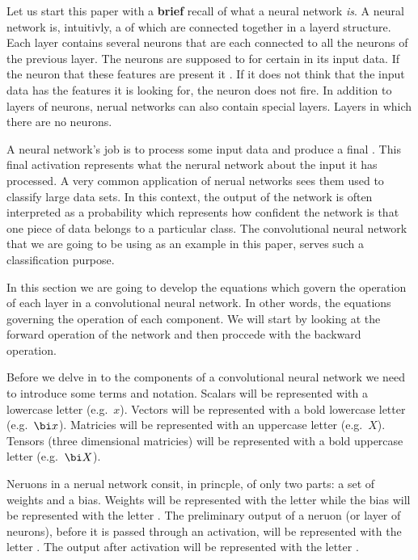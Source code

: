 \startsection[title=Convolutional neural networks and their components]
Let us start this paper with a {\bf brief} recall of what a neural network {\em is}.
A neural network is, intuitivly, a  of  which are connected together in a layerd structure.
Each layer contains several neurons that are each connected to all the neurons of the previous layer. 
The neurons are supposed to  for certain  in its input data.
If the neuron  that these features are present it .
If it does not think that the input data has the features it is looking for, the neuron does not fire.
In addition to layers of neurons, nerual networks can also contain special  layers.
Layers in which there are no neurons.

A neural network's job is to process some input data and produce a final .
This final activation represents what the nerural network  about the input it has processed.
A very common application of nerual networks sees them used to classify large data sets.
In this context, the output of the network is often interpreted as a probability which represents how confident the network is that one piece of data belongs to a particular class.
The convolutional neural network that we are going to be using as an example in this paper, serves such a classification purpose.

In this section we are going to develop the equations which govern the operation of each layer in a convolutional neural network.
In other words, the equations governing the operation of each component.
We will start by looking at the forward operation of the network and then proccede with the backward operation.

\startsubsubject[title=Terminology and notation]
Before we delve in to the components of a convolutional neural network we  need to introduce some terms and notation.
Scalars will be represented with a lowercase letter (e.g.\ $x$).
Vectors will be represented with a bold lowercase letter (e.g.\ $\bi x$).
Matricies will be represented with an uppercase letter (e.g.\ $X$).
Tensors (three dimensional matricies) will be represented with a bold uppercase letter (e.g.\ $\bi X$).

Neruons in a nerual network consit, in princple, of only two parts: a set of weights and a bias.
Weights will be represented with the letter  while the bias will be represented with the letter .
The preliminary output of a neruon (or layer of neurons), before it is passed through an activation, will be represented with the letter .
The output after activation will be represented with the letter .

